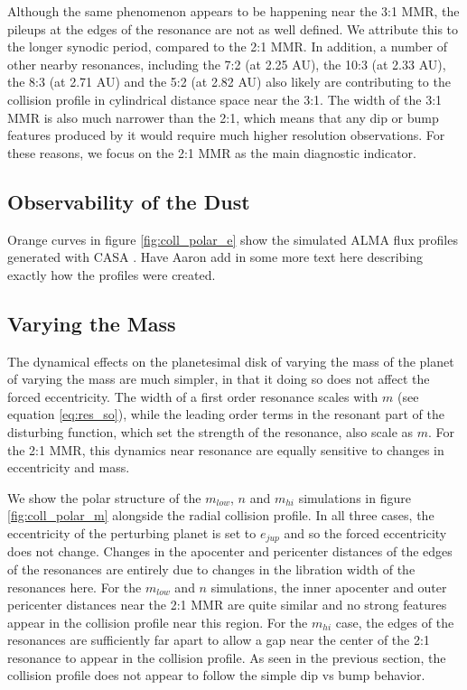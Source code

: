 \documentclass[onecolumn]{aastex63}
\begin{document}
Although the same phenomenon appears to be happening near the 3:1 MMR, the pileups at the edges of the resonance are not as well defined. We attribute this to the longer synodic period, compared to the 2:1 MMR. In addition, a number of other nearby resonances, including the 7:2 (at 2.25 AU), the 10:3 (at 2.33 AU), the 8:3 (at 2.71 AU) and the 5:2 (at 2.82 AU) also likely are contributing to the collision profile in cylindrical distance space near the 3:1. The width of the 3:1 MMR is also much narrower than the 2:1, which means that any dip or bump features produced by it would require much higher resolution observations. For these reasons, we focus on the 2:1 MMR as the main diagnostic indicator.

\subsection{Observability of the Dust}

Orange curves in figure \ref{fig:coll_polar_e} show the simulated ALMA flux profiles generated with {\sc CASA} \citep{2007ASPC..376..127M}. Have Aaron add in some more text here describing exactly how the profiles were created.

\subsection{Varying the Mass}

The dynamical effects on the planetesimal disk of varying the mass of the planet of varying the mass are much simpler, in that it doing so does not affect the forced eccentricity. The width of a first order resonance scales with $m$ (see equation \ref{eq:res_so}), while the leading order terms in the resonant part of the disturbing function, which set the strength of the resonance, also scale as $m$. For the 2:1 MMR, this dynamics near resonance are equally sensitive to changes in eccentricity and mass.

We show the polar structure of the $m_{low}$, $n$ and $m_{hi}$ simulations in figure \ref{fig:coll_polar_m} alongside the radial collision profile. In all three cases, the eccentricity of the perturbing planet is set to $e_{jup}$ and so the forced eccentricity does not change. Changes in the apocenter and pericenter distances of the edges of the resonances are entirely due to changes in the libration width of the resonances here. For the $m_{low}$ and $n$ simulations, the inner apocenter and outer pericenter distances near the 2:1 MMR are quite similar and no strong features appear in the collision profile near this region. For the $m_{hi}$ case, the edges of the resonances are sufficiently far apart to allow a gap near the center of the 2:1 resonance to appear in the collision profile. As seen in the previous section, the collision profile does not appear to follow the simple dip vs bump behavior.
\end{document}
